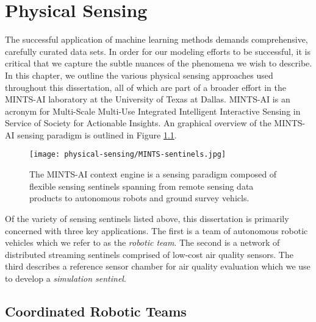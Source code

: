 \chapter{Physical Sensing}

The successful application of machine learning methods demands comprehensive, carefully curated data sets. In order for our modeling efforts to be successful, it is critical that we capture the subtle nuances of the phenomena we wish to describe. In this chapter, we outline the various physical sensing approaches used throughout this dissertation, all of which are part of a broader effort in the MINTS-AI laboratory at the University of Texas at Dallas. MINTS-AI is an acronym for Multi-Scale Multi-Use Integrated Intelligent Interactive Sensing in Service of Society for Actionable Insights. An graphical overview of the MINTS-AI sensing paradigm is outlined in Figure \ref{fig:mints-ai}.

\begin{figure}[!hbt]
  \centering
  \texttt{[image: physical-sensing/MINTS-sentinels.jpg]}
  \caption{The MINTS-AI context engine is a sensing paradigm composed of flexible sensing sentinels spanning from remote sensing data products to autonomous robots and ground survey vehicls.}
  \label{fig:mints-ai}
\end{figure}

Of the variety of sensing sentinels listed above, this dissertation is primarily concerned with three key applications. The first is a team of autonomous robotic vehicles which we refer to as the \textit{robotic team}. The second is a network of distributed streaming sentinels comprised of low-cost air quality sensors. The third describes a reference sensor chamber for air quality evaluation which we use to develop a \textit{simulation sentinel}.



\section{Coordinated Robotic Teams}

